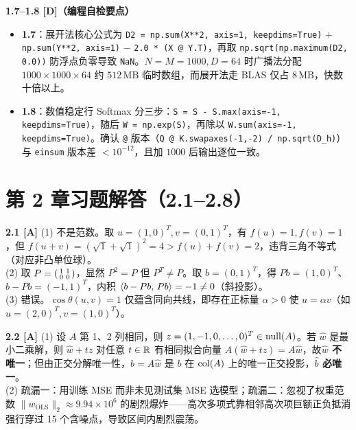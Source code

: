 \textbf{1.7--1.8 [D]（编程自检要点）}
\begin{itemize}
  \item \textbf{1.7}：展开法核心公式为 \texttt{D2 = np.sum(X**2, axis=1, keepdims=True)} + \texttt{np.sum(Y**2, axis=1)} $-$ \texttt{2.0 * (X @ Y.T)}，再取 \texttt{np.sqrt(np.maximum(D2, 0.0))} 防浮点负零导致 \texttt{NaN}。$N=M=1000, D=64$ 时广播法分配 $1000\times 1000\times 64$ 约 $512\,\text{MB}$ 临时数组，而展开法走 BLAS 仅占 $8\,\text{MB}$，快数十倍以上。
  \item \textbf{1.8}：数值稳定行 Softmax 分三步：\texttt{S = S - S.max(axis=-1, keepdims=True)}，随后 \texttt{W = np.exp(S)}，再除以 \texttt{W.sum(axis=-1, keepdims=True)}。确认 \texttt{@} 版本（\texttt{Q @ K.swapaxes(-1,-2) / np.sqrt(D\_h)}）与 \texttt{einsum} 版本差 $<10^{-12}$，且加 $1000$ 后输出逐位一致。
\end{itemize}

\section{第 2 章习题解答（2.1--2.8）}

\textbf{2.1 [A]}
(1) 不是范数。取 $u=(1,0)^T, v=(0,1)^T$，有 $f(u)=1, f(v)=1$，但 $f(u+v) = (\sqrt{1}+\sqrt{1})^2 = 4 > f(u)+f(v)=2$，违背三角不等式（对应非凸单位球）。\\
(2) 取 $P = \begin{psmallmatrix}1&1\\0&0\end{psmallmatrix}$，显然 $P^2=P$ 但 $P^T\neq P$。取 $b=(0,1)^T$，得 $Pb=(1,0)^T$、$b-Pb=(-1,1)^T$，内积 $\left\langle b-Pb,\, Pb \right\rangle=-1\neq 0$（斜投影）。\\
(3) 错误。$\cos\theta(u,v)=1$ 仅蕴含同向共线，即存在正标量 $\alpha>0$ 使 $u = \alpha v$（如 $u=(2,0)^T, v=(1,0)^T$）。

\textbf{2.2 [A]}
(1) 设 $A$ 第 1、2 列相同，则 $z=(1,-1,0,\dots,0)^T \in \operatorname{null}(A)$。若 $\hat{w}$ 是最小二乘解，则 $\hat{w}+tz$ 对任意 $t\in\mathbb{R}$ 有相同拟合向量 $A(\hat{w}+tz)=A\hat{w}$，故\textbf{$\hat{w}$ 不唯一}；但由正交分解唯一性，$\hat{b}=A\hat{w}$ 是 $b$ 在 $\operatorname{col}(A)$ 上的唯一正交投影，\textbf{$\hat{b}$ 必唯一}。\\
(2) 疏漏一：用训练 MSE 而非未见测试集 MSE 选模型；疏漏二：忽视了权重范数 $\|w_{\text{OLS}}\|_2 \approx 9.94\times 10^6$ 的剧烈爆炸——高次多项式靠相邻高次项巨额正负抵消强行穿过 15 个含噪点，导致区间内剧烈震荡。

